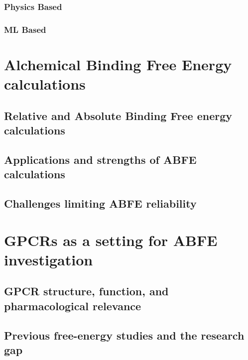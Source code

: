 \lipsum[1][1-3]

\subsubsection{Physics Based}

\lipsum[1][1-3]

\subsubsection{ML Based}

\lipsum[1][1-3]

\section{Alchemical Binding Free Energy calculations} %

\lipsum[1][1-3]

\subsection{Relative and Absolute Binding Free energy calculations}

\lipsum[1][1-3]

\subsection{Applications and strengths of ABFE calculations}

\subsection{Challenges limiting ABFE reliability}

\section{GPCRs as a setting for ABFE investigation}

\lipsum[1][1-3]

\subsection{GPCR structure, function, and pharmacological relevance}

\lipsum[1][1-3]

\subsection{Previous free-energy studies and the research gap}

